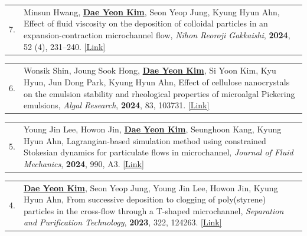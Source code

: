 \documentclass[11pt, a4paper]{article}
\makeatletter
\newenvironment{pubitem}[2]{%
  \begin{tabularx}{\textwidth}{@{}p{1cm}X@{}}
  #1 & #2 \\
  \end{tabularx}
}{}
\makeatother
\begin{document}
    \vspace{0.3em}
    
    \begin{pubitem}{7.}{Minsun Hwang, \textbf{\underline{Dae Yeon Kim}}, Seon Yeop Jung, Kyung Hyun Ahn, 
    Effect of fluid viscosity on the deposition of colloidal particles in an expansion-contraction microchannel flow, 
    \textit{Nihon Reoroji Gakkaishi}, \textbf{2024}, 52 (4), 231--240.     \href{https://www.jstage.jst.go.jp/article/rheology/52/4/52_231/_article}{[Link]}}
    \end{pubitem}
    
    \vspace{0.3em}
    
    \begin{pubitem}{6.}{Wonsik Shin, Joung Sook Hong, \textbf{\underline{Dae Yeon Kim}}, Si Yoon Kim, Kyu Hyun, Jun Dong Park, Kyung Hyun Ahn, 
    Effect of cellulose nanocrystals on the emulsion stability and rheological properties of microalgal Pickering emulsions, 
    \textit{Algal Research}, \textbf{2024}, 83, 103731. 
    \href{https://doi.org/10.1016/j.algal.2024.103731}{[Link]}}
    \end{pubitem}
    
    \vspace{0.3em}
    
    \begin{pubitem}{5.}{Young Jin Lee, Howon Jin, \textbf{\underline{Dae Yeon Kim}}, Seunghoon Kang, Kyung Hyun Ahn, 
    Lagrangian-based simulation method using constrained Stokesian dynamics for particulate flows in microchannel, 
    \textit{Journal of Fluid Mechanics}, \textbf{2024}, 990, A3. 
    \href{https://doi.org/10.1017/jfm.2024.493}{[Link]}}
    \end{pubitem}
    
    \vspace{0.3em}
    
    \begin{pubitem}{4.}{\textbf{\underline{Dae Yeon Kim}}, Seon Yeop Jung, Young Jin Lee, Howon Jin, Kyung Hyun Ahn, 
    From successive deposition to clogging of poly(styrene) particles in the cross-flow through a T-shaped microchannel, 
    \textit{Separation and Purification Technology}, \textbf{2023}, 322, 124263. 
    \href{https://doi.org/10.1016/j.seppur.2023.124263}{[Link]}}
    \end{pubitem}
    
    \vspace{0.3em}
    
\end{document}

